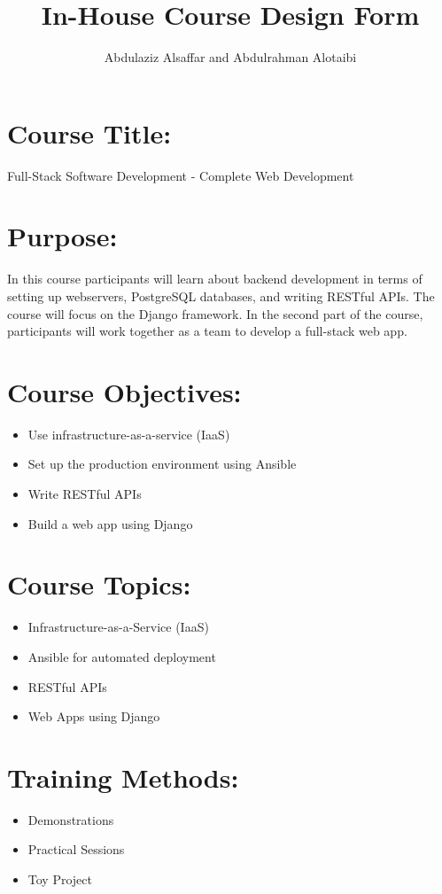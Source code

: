 \documentclass[a4paper,11pt]{article}
\author{Abdulaziz Alsa{f}far and Abdulrahman Alotaibi}
\title{In-House Course Design Form}
\begin{document}
\pagestyle{plain}
\setcounter{page}{1}

\section{Course Title:}
Full-Stack Software Development - Complete Web Development

\section{Purpose:}
In this course participants will learn about backend development in terms of setting up webservers, PostgreSQL databases, and writing RESTful APIs. The course will focus on the Django framework. In the second part of the course, participants will work together as a team to develop a full-stack web app.

\section{Course Objectives:}
\begin{itemize}
	\item Use infrastructure-as-a-service (IaaS)
	\item Set up the production environment using Ansible
	\item Write RESTful APIs
	\item Build a web app using Django	
\end{itemize}

\section{Course Topics:}
\begin{itemize}
	\item Infrastructure-as-a-Service (IaaS)
	\item Ansible for automated deployment
	\item RESTful APIs
	\item Web Apps using Django
\end{itemize}

\section{Training Methods:}
\begin{itemize}
	\item Demonstrations
	\item Practical Sessions
	\item Toy Project
\end{itemize}
\end{document}
